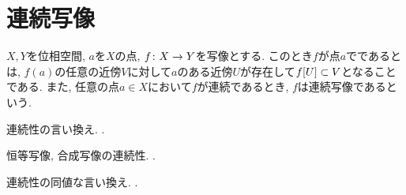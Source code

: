 \documentclass[uplatex, dvipdfmx, a4paper, 12pt, class=jsbook, crop=false]{standalone}
\begin{document}
\section{連続写像}
\label{sec:continuous-maps}

\begin{definition}
	$ X, Y $を位相空間, $ a $を$ X $の点, $ f\colon X\to Y $を写像とする.
	このとき$ f $が点$ a $でであるとは,
	$ f(a) $の任意の近傍$ V $に対して$ a $のある近傍$ U $が存在して$ \mapset{f}{U} \subset V $となることである.
	また, 任意の点$ a \in X $において$ f $が連続であるとき, $ f $は連続写像であるという.
\end{definition}

\begin{proposition}
	連続性の言い換え.
	\WIP.
\end{proposition}

恒等写像, 合成写像の連続性.
\WIP.

\begin{proposition}
	連続性の同値な言い換え.
	\WIP.
\end{proposition}
\end{document}
